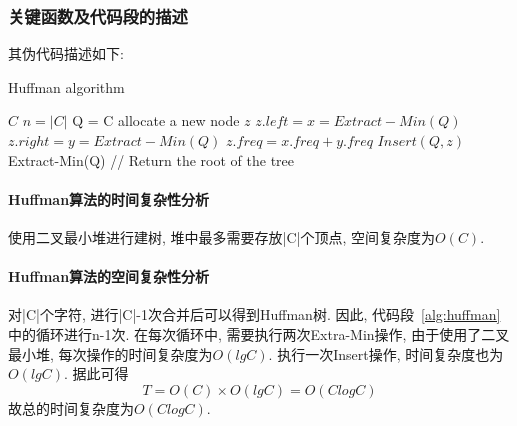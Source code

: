 \subsubsection{关键函数及代码段的描述}
其伪代码描述如下:
\begin{algorithm}
	\caption{Huffman algorithm}\label{alg:huffman}
	\begin{algorithmic}
		\Require $C$
		\State $n = |C|$
		\State Q = C
		allocate a new node $\mathit{z}$
		\State $\mathit{z}.left = x = Extract-Min(Q)$
		\State $\mathit{z}.right = y = Extract-Min(Q)$
		\State $\mathit{z}.freq = x.freq + y.freq$
		\State $Insert(Q, \mathit{z})$
		\EndFor
		\Return Extract-Min(Q) // Return the root of the tree
	\end{algorithmic}
\end{algorithm}

\paragraph{Huffman算法的时间复杂性分析}
使用二叉最小堆进行建树, 堆中最多需要存放|C|个顶点, 空间复杂度为$O(C)$.

\paragraph{Huffman算法的空间复杂性分析}
对|C|个字符, 进行|C|-1次合并后可以得到Huffman树. 因此,
代码段~\ref{alg:huffman}中的循环进行n-1次. 在每次循环中,
需要执行两次Extra-Min操作, 由于使用了二叉最小堆, 每次操作的时间复杂度为$O(lgC)$.
执行一次Insert操作, 时间复杂度也为$O(lgC)$. 据此可得
\begin{equation}
	T = O(C) \times O(lgC) = O(ClogC)
	\label{eq:huffmanTimeComplexity}
\end{equation}
故总的时间复杂度为$O(ClogC)$.
